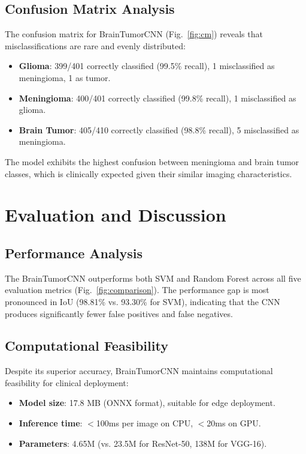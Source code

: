 \documentclass[conference]{IEEEtran}
\begin{document}
\subsection{Confusion Matrix Analysis}
The confusion matrix for BrainTumorCNN (Fig.~\ref{fig:cm}) reveals that misclassifications are rare and evenly distributed:
\begin{itemize}
    \item \textbf{Glioma}: 399/401 correctly classified (99.5\% recall), 1 misclassified as meningioma, 1 as tumor.
    \item \textbf{Meningioma}: 400/401 correctly classified (99.8\% recall), 1 misclassified as glioma.
    \item \textbf{Brain Tumor}: 405/410 correctly classified (98.8\% recall), 5 misclassified as meningioma.
\end{itemize}

The model exhibits the highest confusion between meningioma and brain tumor classes, which is clinically expected given their similar imaging characteristics.


\section{Evaluation and Discussion}
\label{sec:evaluation}

\subsection{Performance Analysis}
The BrainTumorCNN outperforms both SVM and Random Forest across all five evaluation metrics (Fig.~\ref{fig:comparison}). The performance gap is most pronounced in IoU (98.81\% vs. 93.30\% for SVM), indicating that the CNN produces significantly fewer false positives and false negatives.

\subsection{Computational Feasibility}
Despite its superior accuracy, BrainTumorCNN maintains computational feasibility for clinical deployment:
\begin{itemize}
    \item \textbf{Model size}: 17.8 MB (ONNX format), suitable for edge deployment.
    \item \textbf{Inference time}: $<$100ms per image on CPU, $<$20ms on GPU.
    \item \textbf{Parameters}: 4.65M (vs. 23.5M for ResNet-50, 138M for VGG-16).
\end{itemize}
\end{document}
